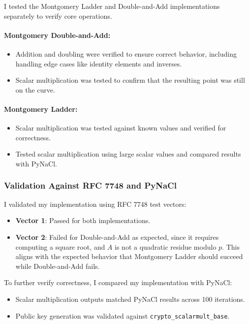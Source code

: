 \documentclass[twoside,a4paper,12pt]{article}
\begin{document}
I tested the Montgomery Ladder and Double-and-Add implementations separately to verify core operations.

\paragraph{Montgomery Double-and-Add:}
\begin{itemize}
    \item Addition and doubling were verified to ensure correct behavior, including handling edge cases like identity elements and inverses.
    \item Scalar multiplication was tested to confirm that the resulting point was still on the curve.
\end{itemize}

\paragraph{Montgomery Ladder:}
\begin{itemize}
    \item Scalar multiplication was tested against known values and verified for correctness.
    \item Tested scalar multiplication using large scalar values and compared results with PyNaCl.
\end{itemize}

\subsubsection{Validation Against RFC 7748 and PyNaCl}

I validated my implementation using RFC 7748 test vectors:
\begin{itemize}
    \item \textbf{Vector 1}: Passed for both implementations.
    \item \textbf{Vector 2}: Failed for Double-and-Add as expected, since it requires computing a square root, and \( A \) is not a quadratic residue modulo \( p \). This aligns with the expected behavior that Montgomery Ladder should succeed while Double-and-Add fails.

\end{itemize}

To further verify correctness, I compared my implementation with PyNaCl:
\begin{itemize}
    \item {Scalar multiplication outputs} matched PyNaCl results across 100 iterations.
    \item {Public key generation} was validated against \texttt{crypto\_scalarmult\_base}.
\end{itemize}
\end{document}
